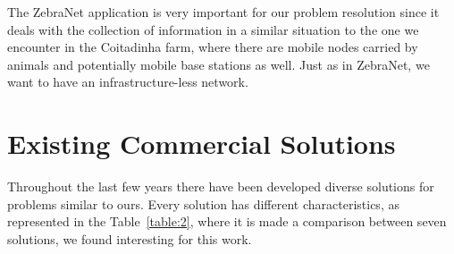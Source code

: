 The ZebraNet application is very important for our problem resolution since it deals with the
collection of information in a similar situation to the one we encounter in the Coitadinha
farm, where there are mobile nodes carried by animals and potentially mobile base stations
as well. Just as in ZebraNet, we want to have an infrastructure-less network.



\section{Existing Commercial Solutions}
\label{sec:existing_commercial_solutions}
Throughout the last few years there have been developed diverse solutions for problems similar
to ours. Every solution has different characteristics, as represented in the Table~\ref{table:2},
where it is made a comparison between seven solutions, we found interesting for this work.

